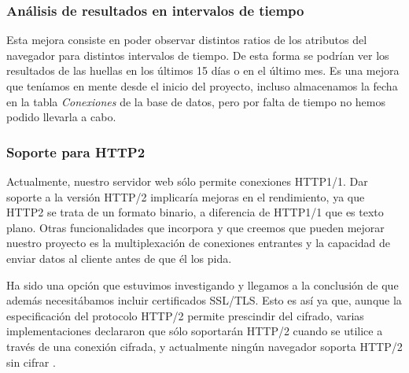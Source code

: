 \subsubsection{Análisis de resultados en intervalos de tiempo}
Esta mejora consiste en poder observar distintos ratios de los atributos del navegador para distintos intervalos de tiempo. De esta forma se podrían ver los resultados de las huellas en los últimos 15 días o en el último mes. Es una mejora que teníamos en mente desde el inicio del proyecto, incluso almacenamos la fecha en la tabla \textit{Conexiones} de la base de datos, pero por falta de tiempo no hemos podido llevarla a cabo.
\subsubsection{Soporte para HTTP2}
Actualmente, nuestro servidor web sólo permite conexiones HTTP1/1. Dar soporte a la versión HTTP/2 implicaría mejoras en el rendimiento, ya que HTTP2 se trata de un formato binario, a diferencia de HTTP1/1 que es texto plano. Otras funcionalidades que incorpora y que creemos que pueden mejorar nuestro proyecto es la multiplexación de conexiones entrantes y la capacidad de enviar datos al cliente antes de que él los pida. \par
Ha sido una opción que estuvimos investigando y llegamos a la conclusión de que además necesitábamos incluir certificados SSL/TLS. Esto es así ya que, aunque la especificación del protocolo HTTP/2 permite prescindir del cifrado, varias implementaciones declararon que sólo soportarán HTTP/2 cuando se utilice a través de una conexión cifrada, y actualmente ningún navegador soporta HTTP/2 sin cifrar \cite{http2}. \par
\noindent
